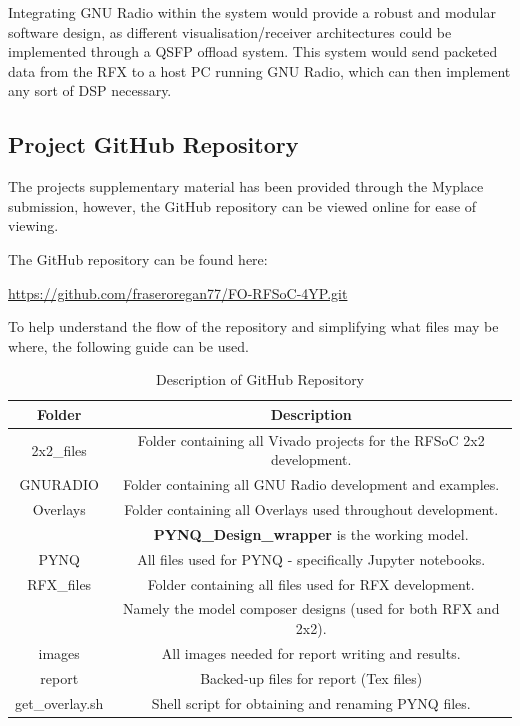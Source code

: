 \documentclass[12pt, a4paper]{article}
\begin{document}
Integrating GNU Radio within the system would provide a robust and modular software design, as different visualisation/receiver architectures could be implemented through a QSFP offload system. This system would send packeted data from the RFX to a host PC running GNU Radio, which can then implement any sort of DSP necessary.


\newpage



\newpage
\begin{appendices}
\section{Project GitHub Repository}

The projects supplementary material has been provided through the Myplace submission, however, the GitHub repository can be viewed online for ease of viewing.

The GitHub repository can be found here: 

\url{https://github.com/fraseroregan77/FO-RFSoC-4YP.git}

To help understand the flow of the repository and simplifying what files may be where, the following guide can be used.

\begin{table}[h]
    \centering
    \begin{tabular}{|c|c|}\hline
        \textbf{Folder} & \textbf{Description} \\\hline
        2x2\_files & Folder containing all Vivado projects for the RFSoC 2x2 development.\\\hline
        GNURADIO & Folder containing all GNU Radio development and examples. \\ \hline
        Overlays & Folder containing all Overlays used throughout development.\\ 
        & \textbf{PYNQ\_Design\_wrapper} is the working model.\\ \hline
        PYNQ & All files used for PYNQ - specifically Jupyter notebooks.\\ \hline 
        RFX\_files & Folder containing all files used for RFX development. \\
        & Namely the model composer designs (used for both RFX and 2x2).\\\hline
        images & All images needed for report writing and results.\\\hline
        report & Backed-up files for report (Tex files)\\ \hline
        get\_overlay.sh & Shell script for obtaining and renaming PYNQ files.\\ \hline
    \end{tabular}
    \caption{Description of GitHub Repository}
    \label{tab:github}
\end{table}

\end{appendices}
\end{document}
